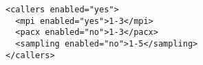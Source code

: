 \begin{verbatim}
<callers enabled="yes">
  <mpi enabled="yes">1-3</mpi>
  <pacx enabled="no">1-3</pacx>
  <sampling enabled="no">1-5</sampling>
</callers>
\end{verbatim}
